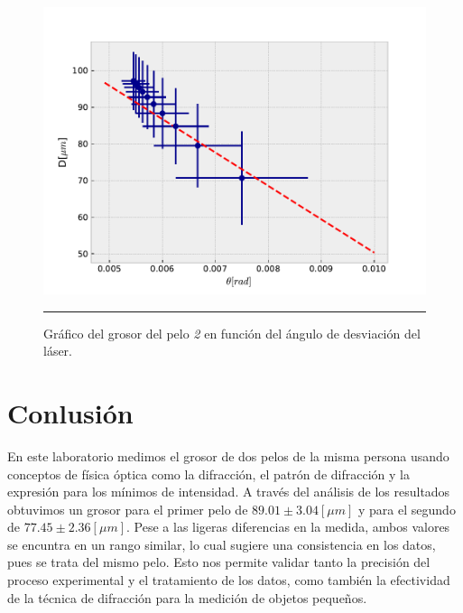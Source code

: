\documentclass[10pt,a4paper]{article}
\begin{document}
\begin{multicols}{2}
	\begin{figure}[H]
		\centering
		\includegraphics[scale=0.4]{Pelo_2.pdf}
		\caption{Gráfico del grosor del pelo \textit{2} en función del ángulo de desviación del láser. }
		\label{Grafico pelo 2}
		\rule{80mm}{0.1mm}
	\end{figure}	
	
	
	
	\section{Conlusión}
	En este laboratorio medimos el grosor de dos pelos de la misma persona usando conceptos de física óptica como la difracción, el patrón de difracción y la expresión para los mínimos de intensidad. A través del análisis de los resultados obtuvimos un grosor para el primer pelo de  $89.01 \pm 3.04 [\mu m]$ y para el segundo de $77.45 \pm 2.36 [\mu m]$. Pese a las ligeras diferencias en la medida, ambos valores se encuntra en un rango similar, lo cual sugiere una consistencia en los datos, pues se trata del mismo pelo. Esto nos permite validar tanto la precisión del proceso experimental y el tratamiento de los datos, como también la efectividad de la técnica de difracción para la medición de objetos pequeños.





	
	
	
	\end{multicols}
\end{document}
